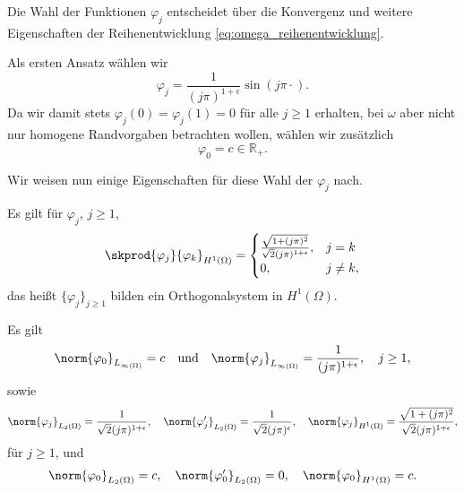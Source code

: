 Die Wahl der Funktionen $\varphi_{j}$ entscheidet über die Konvergenz und weitere Eigenschaften der Reihenentwicklung \eqref{eq:omega_reihenentwicklung}.

Als ersten Ansatz wählen wir
\begin{equation}
    \varphi_{j} = \frac{1}{(j \pi)^{1 + \epsilon}} \sin(j \pi \cdot).
\end{equation}
Da wir damit stets $\varphi_{j}(0) = \varphi_{j}(1) = 0$ für alle $j \geq 1$ erhalten, bei $\omega$ aber nicht nur homogene Randvorgaben betrachten wollen, wählen wir zusätzlich
\begin{equation}
    \varphi_{0} = c \in \mathbb{R}_{+}.
\end{equation}

Wir weisen nun einige Eigenschaften für diese Wahl der $\varphi_{j}$ nach.

\begin{Lemma}[Orthogonalität]
    Es gilt für $\varphi_{j}$, $j \geq 1$,
    \begin{equation}
        \skprod{\varphi_{j}}{\varphi_{k}}_{H^{1}(\Omega)} = \begin{cases}
            \frac{\sqrt{1 + (j \pi)^{2}}}{\sqrt 2 (j \pi)^{1 + \epsilon}},   &j = k \\
            0,          &j \neq k,
        \end{cases}
    \end{equation}
    das heißt $\{ \varphi_{j} \}_{j \geq 1}$ bilden ein Orthogonalsystem in $H^{1}(\Omega)$.
\end{Lemma}

\begin{Lemma}[Normen]
    Es gilt
    \begin{equation}
        \norm{\varphi_{0}}_{L_{\infty(\Omega)}} = c \quad \text{und} \quad \norm{\varphi_{j}}_{L_{\infty(\Omega)}} = \frac{1}{(j \pi)^{1 + \epsilon}}, \quad j \geq 1,
    \end{equation}
    sowie
    \begin{equation}
        \begin{aligned}
            \norm{\varphi_{j}}_{L_{2}(\Omega)}  = \frac{1}{\sqrt{2}(j \pi)^{1+ \epsilon}}, \quad
            \norm{\varphi'_{j}}_{L_{2}(\Omega)} = \frac{1}{\sqrt{2}(j \pi)^{\epsilon}}, \quad
            \norm{\varphi_{j}}_{H^{1}(\Omega)}  = \frac{\sqrt{1 + (j \pi)^{2}}}{\sqrt 2 (j \pi)^{1 + \epsilon}},
        \end{aligned}
    \end{equation}
    für $j \geq 1$, und
    \begin{equation}
        \begin{aligned}
            \norm{\varphi_{0}}_{L_{2}(\Omega)}  = c, \quad
            \norm{\varphi'_{0}}_{L_{2}(\Omega)} = 0, \quad
            \norm{\varphi_{0}}_{H^{1}(\Omega)}  = c.
        \end{aligned}
    \end{equation}
\end{Lemma}

